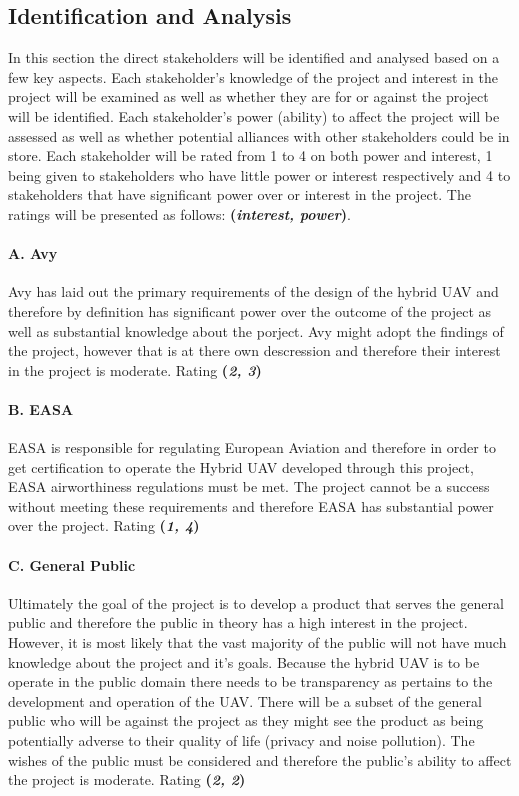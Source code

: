 \subsection{Identification and Analysis}
In this section the direct stakeholders will be identified and analysed based on a few key aspects. Each stakeholder's knowledge of the project and interest in the project will be examined as well as whether they are for or against the project will be identified. Each stakeholder's power (ability) to affect the project will be assessed as well as whether potential alliances with other stakeholders could be in store. Each stakeholder will be rated from 1 to 4 on both power and interest, 1 being given to stakeholders who have little power or interest respectively and 4 to stakeholders that have significant power over or interest in the project. The ratings will be presented as follows: \textbf{(\textit{interest, power})}.

\paragraph{A. Avy}
Avy has laid out the primary requirements of the design of the hybrid UAV and therefore by definition has significant power over the outcome of the project as well as substantial knowledge about the porject. Avy might adopt the findings of the project, however that is at there own descression and therefore their interest in the project is moderate. Rating \textbf{(\textit{2, 3})} 

\paragraph{B. EASA}
EASA is responsible for regulating European Aviation and therefore in order to get certification to operate the Hybrid UAV developed through this project, EASA airworthiness regulations must be met. The project cannot be a success without meeting these requirements and therefore EASA has substantial power over the project. Rating \textbf{(\textit{1, 4})} 

\paragraph{C. General Public}
Ultimately the goal of the project is to develop a product that serves the general public and therefore the public in theory has a high interest in the project. However, it is most likely that the vast majority of the public will not have much knowledge about the project and it's goals. Because the hybrid UAV is to be operate in the public domain there needs to be transparency as pertains to the development and operation of the UAV. There will be a subset of the general public who will be against the project as they might see the product as being potentially adverse to their quality of life (privacy and noise pollution). The wishes of the public must be considered and therefore the public's ability to affect the project is moderate. Rating \textbf{(\textit{2, 2})} 

